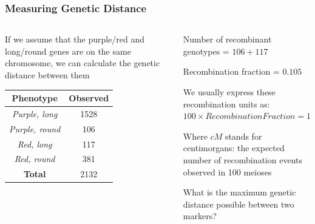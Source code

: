 \documentclass{beamer}
\begin{document}
\begin{frame}
	\frametitle{Measuring Genetic Distance}
	\begin{columns}
		\begin{column}{0.4\textwidth}
				
\small If we assume that the purple/red and long/round genes are on the same chromosome, we can calculate the genetic distance between them

			\vspace{15pt}
			\begin{tabular}{c|c}
				\textbf{Phenotype} & \textbf{Observed } \\
				\hline
				\textit{Purple, long}& 1528\\
				
				\textit{Purple, round}&106\\
				
				\textit{Red, long}&117\\
				
				\textit{Red, round}&381\\
				\hline
				\textbf{Total} & 2132\\
			\end{tabular}	
			
			
			\end{column}
			\begin{column}{0.7\textwidth}

\small			Number of recombinant genotypes = \pause$106+117$

\small Recombination fraction = $0.105$ \\

\vspace{10pt}

\small We usually express these recombination units as:\\

 $100 \times Recombination Fraction = 10.5cM$
 \vspace{30pt}
 
Where $cM$ stands for centimorgans: the expected number of recombination events observed in 100 meioses

\pause
\vspace{30pt}

What is the maximum genetic distance possible between two markers?


			\end{column}
		\end{columns}
		
	\end{frame}
	
\end{document}
